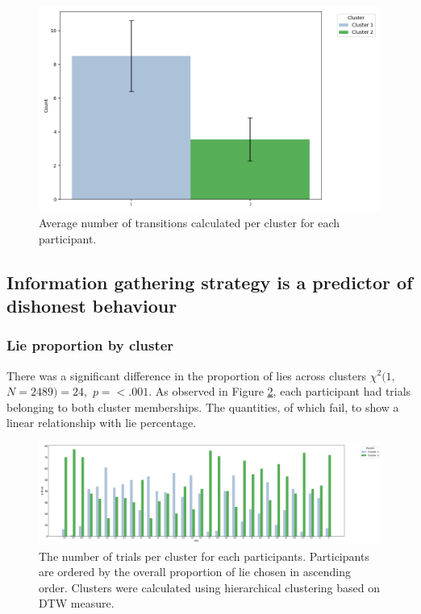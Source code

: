 \documentclass[man, floatsintext]{apa7}
\begin{document}
\begin{figure}[H]
	\centering
	\includegraphics[width=0.75\linewidth]{../plots/ALLTRIAL/NTransitions.png}
	\caption{Average number of transitions calculated per cluster for each participant.}
	\label{fig:NTransitionsPerCluster}
\end{figure}


\subsection{Information gathering strategy is a predictor of dishonest behaviour}

\subsubsection{Lie proportion by cluster}

There was a significant difference in the proportion of lies across clusters $\chi^2(1,$ $N=2489) = 24,$ $p=<.001$. As observed in Figure \ref{fig:NTrialsByPIDPerCluster}, each participant had trials belonging to both cluster memberships. The quantities, of which fail, to show a linear relationship with lie percentage.

\begin{figure}[H]
	\centering
	\includegraphics[width=\linewidth]{../plots/ALLTRIAL/NTrialsByPID.png}
	\caption{The number of trials per cluster for each participants. Participants are ordered by the overall proportion of lie chosen in ascending order. Clusters were calculated using hierarchical clustering based on DTW measure.}
	\label{fig:NTrialsByPIDPerCluster}
\end{figure}
\end{document}
